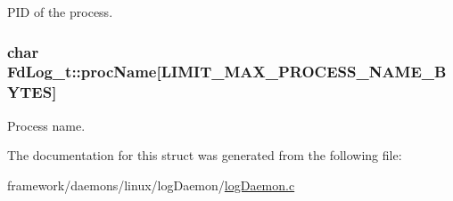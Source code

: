 P\+ID of the process. 

\subsubsection[{\texorpdfstring{proc\+Name}{procName}}]{\setlength{\rightskip}{0pt plus 5cm}char Fd\+Log\+\_\+t\+::proc\+Name\mbox{[}{\bf L\+I\+M\+I\+T\+\_\+\+M\+A\+X\+\_\+\+P\+R\+O\+C\+E\+S\+S\+\_\+\+N\+A\+M\+E\+\_\+\+B\+Y\+T\+ES}\mbox{]}}\hypertarget{struct_fd_log__t_aeac1eaa017ca8575460fc0d8172ba386}{}\label{struct_fd_log__t_aeac1eaa017ca8575460fc0d8172ba386}


Process name. 



The documentation for this struct was generated from the following file\+:\begin{DoxyCompactItemize}
\item 
framework/daemons/linux/log\+Daemon/\hyperlink{log_daemon_8c}{log\+Daemon.\+c}\end{DoxyCompactItemize}
